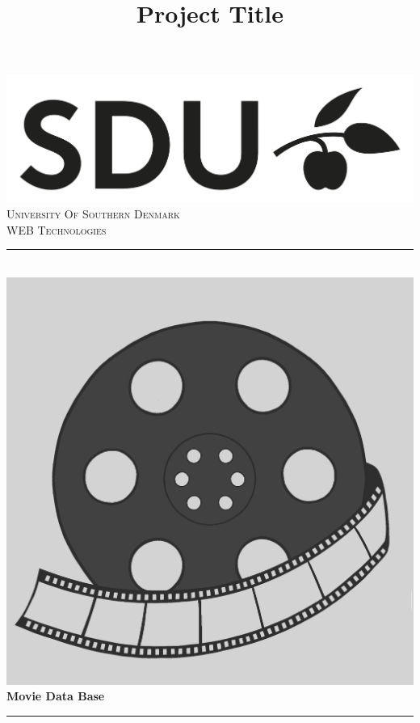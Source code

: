 \documentclass[letterpaper,twocolumn]{article}
\title{Project Title}
\date{}
\begin{document}
\begin{titlepage}
\newcommand{\HRule}{\rule{\linewidth}{0.5mm}} %

\center %

\includegraphics[scale=0.5]{images/SDULogo.png}\\[0.1cm] 


\textsc{University Of Southern Denmark}\\[3cm] 
\textsc{\Large WEB Technologies}\\[0.5cm] 

\HRule \\[0.4cm]
\includegraphics[scale=0.04]{images/Logo.png}\\[0.1cm] 
{ \huge \bfseries Movie Data Base}\\[0.4cm] %
\HRule \\[1cm]


\end{titlepage}
\end{document}

